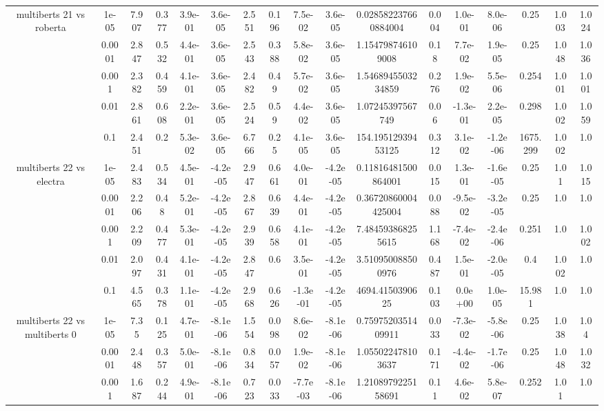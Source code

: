 \begin{tabular}{|c|c|c|c|c|c|c|c|c|c|c|c|c|c|c|c|c|}
\hline
\multirow{5}{*}{multiberts 21 vs roberta } & 1e-05 & 7.907 & 0.377 & 3.9e-01 & 3.6e-05 & 2.551 & 0.196 & 7.5e-02 & 3.6e-05 & 0.028582237660884004 & 0.004 & 1.0e-01 & 8.0e-06 & 0.25 & 1.003 & 1.024 \\
 & 0.0001 & 2.847 & 0.532 & 4.4e-01 & 3.6e-05 & 2.543 & 0.388 & 5.8e-02 & 3.6e-05 & 1.154798746109008 & 0.18 & 7.7e-02 & 1.9e-05 & 0.25 & 1.048 & 1.036 \\
 & 0.001 & 2.382 & 0.459 & 4.1e-01 & 3.6e-05 & 2.482 & 0.49 & 5.7e-02 & 3.6e-05 & 1.5468945503234859 & 0.276 & 1.9e-02 & 5.5e-06 & 0.254 & 1.001 & 1.001 \\
 & 0.01 & 2.861 & 0.608 & 2.2e-01 & 3.6e-05 & 2.524 & 0.59 & 4.4e-02 & 3.6e-05 & 1.07245397567749 & 0.06 & -1.3e-01 & 2.2e-05 & 0.298 & 1.002 & 1.059 \\
 & 0.1 & 2.451 & 0.2 & 5.3e-02 & 3.6e-05 & 6.766 & 0.25 & 4.1e-05 & 3.6e-05 & 154.19512939453125 & 0.312 & 3.1e-02 & -1.2e-06 & 1675.299 & 1.002 & 1.0 \\
\hline
\multirow{5}{*}{multiberts 22 vs electra } & 1e-05 & 2.483 & 0.534 & 4.5e-01 & -4.2e-05 & 2.947 & 0.661 & 4.0e-01 & -4.2e-05 & 0.11816481500864001 & 0.015 & 1.3e-01 & -1.6e-05 & 0.25 & 1.01 & 1.015 \\
 & 0.0001 & 2.206 & 0.48 & 5.2e-01 & -4.2e-05 & 2.867 & 0.639 & 4.4e-01 & -4.2e-05 & 0.36720860004425004 & 0.088 & -9.5e-02 & -3.2e-05 & 0.25 & 1.0 & 1.0 \\
 & 0.001 & 2.209 & 0.477 & 5.3e-01 & -4.2e-05 & 2.939 & 0.658 & 4.1e-01 & -4.2e-05 & 7.484593868255615 & 1.168 & -7.4e-02 & -2.4e-06 & 0.251 & 1.0 & 1.002 \\
 & 0.01 & 2.097 & 0.431 & 4.1e-01 & -4.2e-05 & 2.847 & 0.6 & 3.5e-01 & -4.2e-05 & 3.510950088500976 & 0.487 & 1.5e-01 & -2.0e-05 & 0.4 & 1.002 & 1.0 \\
 & 0.1 & 4.565 & 0.378 & 1.1e-01 & -4.2e-05 & 2.968 & 0.626 & -1.3e-01 & -4.2e-05 & 4694.4150390625 & 0.103 & 0.0e+00 & 1.0e-05 & 15.981 & 1.0 & 1.0 \\
\hline
\multirow{5}{*}{multiberts 22 vs multiberts 0} & 1e-05 & 7.35 & 0.125 & 4.7e-01 & -8.1e-06 & 1.554 & 0.098 & 8.6e-02 & -8.1e-06 & 0.7597520351409911 & 0.033 & -7.3e-02 & -5.8e-06 & 0.25 & 1.038 & 1.04 \\
 & 0.0001 & 2.448 & 0.357 & 5.0e-01 & -8.1e-06 & 0.834 & 0.057 & 1.9e-02 & -8.1e-06 & 1.055022478103637 & 0.171 & -4.4e-02 & -1.7e-06 & 0.25 & 1.048 & 1.032 \\
 & 0.001 & 1.687 & 0.244 & 4.9e-01 & -8.1e-06 & 0.723 & 0.033 & -7.7e-03 & -8.1e-06 & 1.2108979225158691 & 0.11 & 4.6e-02 & 5.8e-07 & 0.252 & 1.01 & 1.0 \\

\end{tabular}
